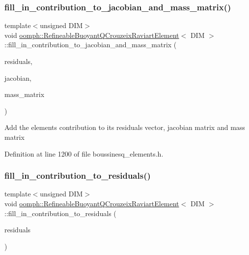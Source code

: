 \subsubsection{\texorpdfstring{fill\+\_\+in\+\_\+contribution\+\_\+to\+\_\+jacobian\+\_\+and\+\_\+mass\+\_\+matrix()}{fill\_in\_contribution\_to\_jacobian\_and\_mass\_matrix()}}
{\footnotesize\ttfamily template$<$unsigned D\+IM$>$ \\
void \hyperlink{classoomph_1_1RefineableBuoyantQCrouzeixRaviartElement}{oomph\+::\+Refineable\+Buoyant\+Q\+Crouzeix\+Raviart\+Element}$<$ D\+IM $>$\+::fill\+\_\+in\+\_\+contribution\+\_\+to\+\_\+jacobian\+\_\+and\+\_\+mass\+\_\+matrix (\begin{DoxyParamCaption}\item[{Vector$<$ double $>$ \&}]{residuals,  }\item[{Dense\+Matrix$<$ double $>$ \&}]{jacobian,  }\item[{Dense\+Matrix$<$ double $>$ \&}]{mass\+\_\+matrix }\end{DoxyParamCaption})\hspace{0.3cm}{\ttfamily [inline]}}

Add the element\textquotesingle{}s contribution to its residuals vector, jacobian matrix and mass matrix 

Definition at line 1200 of file boussinesq\+\_\+elements.\+h.

\mbox{\label{classoomph_1_1RefineableBuoyantQCrouzeixRaviartElement_a102b3aeb79d9af430b9ce0a7c8d5bd33}} 
\subsubsection{\texorpdfstring{fill\+\_\+in\+\_\+contribution\+\_\+to\+\_\+residuals()}{fill\_in\_contribution\_to\_residuals()}}
{\footnotesize\ttfamily template$<$unsigned D\+IM$>$ \\
void \hyperlink{classoomph_1_1RefineableBuoyantQCrouzeixRaviartElement}{oomph\+::\+Refineable\+Buoyant\+Q\+Crouzeix\+Raviart\+Element}$<$ D\+IM $>$\+::fill\+\_\+in\+\_\+contribution\+\_\+to\+\_\+residuals (\begin{DoxyParamCaption}\item[{Vector$<$ double $>$ \&}]{residuals }\end{DoxyParamCaption})\hspace{0.3cm}{\ttfamily [inline]}}



